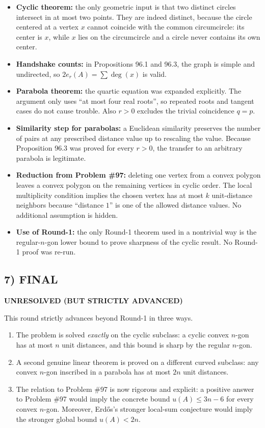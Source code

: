 \begin{itemize}
\item \textbf{Cyclic theorem:} the only geometric input is that two distinct circles intersect in at most two points. They are indeed distinct, because the circle centered at a vertex $x$ cannot coincide with the common circumcircle: its center is $x$, while $x$ lies on the circumcircle and a circle never contains its own center.
\item \textbf{Handshake counts:} in Propositions 96.1 and 96.3, the graph is simple and undirected, so $2e_r(A)=\sum \deg(x)$ is valid.
\item \textbf{Parabola theorem:} the quartic equation was expanded explicitly. The argument only uses ``at most four real roots'', so repeated roots and tangent cases do not cause trouble. Also $r>0$ excludes the trivial coincidence $q=p$.
\item \textbf{Similarity step for parabolas:} a Euclidean similarity preserves the number of pairs at any prescribed distance value up to rescaling the value. Because Proposition 96.3 was proved for every $r>0$, the transfer to an arbitrary parabola is legitimate.
\item \textbf{Reduction from Problem \#97:} deleting one vertex from a convex polygon leaves a convex polygon on the remaining vertices in cyclic order. The local multiplicity condition implies the chosen vertex has at most $k$ unit-distance neighbors because ``distance $1$'' is one of the allowed distance values. No additional assumption is hidden.
\item \textbf{Use of Round-1:} the only Round-1 theorem used in a nontrivial way is the regular-$n$-gon lower bound to prove sharpness of the cyclic result. No Round-1 proof was re-run.
\end{itemize}

\subsection*{7) FINAL}

\textbf{UNRESOLVED (BUT STRICTLY ADVANCED)}

This round strictly advances beyond Round-1 in three ways.

\begin{enumerate}
\item The problem is solved \emph{exactly} on the cyclic subclass: a cyclic convex $n$-gon has at most $n$ unit distances, and this bound is sharp by the regular $n$-gon.
\item A second genuine linear theorem is proved on a different curved subclass: any convex $n$-gon inscribed in a parabola has at most $2n$ unit distances.
\item The relation to Problem \#97 is now rigorous and explicit: a positive answer to Problem \#97 would imply the concrete bound $u(A)\le 3n-6$ for every convex $n$-gon. Moreover, Erdős's stronger local-sum conjecture would imply the stronger global bound $u(A)<2n$.
\end{enumerate}

